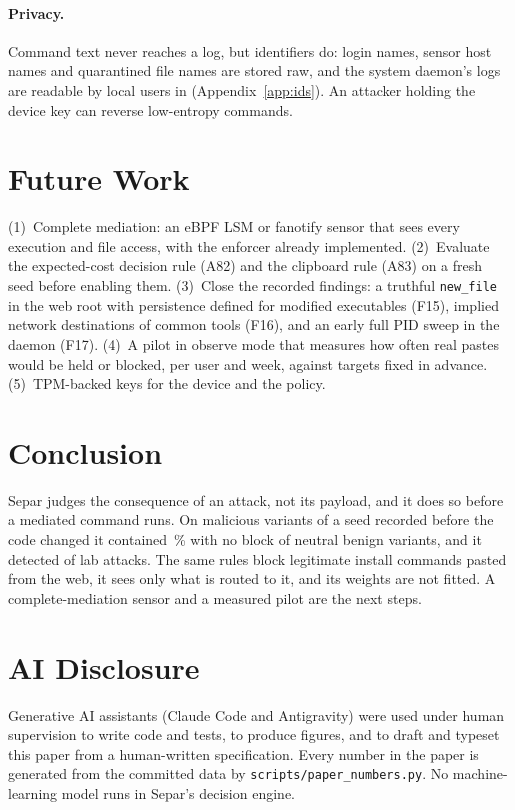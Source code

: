 \documentclass[10pt,twocolumn,letterpaper]{article}
\begin{document}
\paragraph{Privacy.} Command text never reaches a log, but identifiers do: login names, sensor host
names and quarantined file names are stored raw, and the system daemon's logs are readable by local
users in \Version{} (Appendix~\ref{app:ids}). An attacker holding the device key can reverse
low-entropy commands.

\section{Future Work}
\label{sec:future}
(1)~Complete mediation: an eBPF LSM or fanotify sensor that sees every execution and file access,
with the enforcer already implemented. (2)~Evaluate the expected-cost decision rule (A82) and the
clipboard rule (A83) on a fresh seed before enabling them. (3)~Close the recorded findings: a
truthful \texttt{new\_file} in the web root with persistence defined for modified executables
(F15), implied network destinations of common tools (F16), and an early full PID sweep in the
daemon (F17). (4)~A pilot in observe mode that measures how often real pastes would be held or
blocked, per user and week, against targets fixed in advance. (5)~TPM-backed keys for the device
and the policy.

\section{Conclusion}
Separ judges the consequence of an attack, not its payload, and it does so before a mediated
command runs. On \MalTotal{} malicious variants of a seed recorded before the code changed it
contained \MalContainedPct\,\% with no block of \BenNeutralTotal{} neutral benign variants, and it
detected \LabDetected{} of \LabAttacksAll{} lab attacks. The same rules block legitimate install
commands pasted from the web, it sees only what is routed to it, and its weights are not fitted.
A complete-mediation sensor and a measured pilot are the next steps.

\section*{AI Disclosure}
Generative AI assistants (Claude Code and Antigravity) were used under human supervision to write
code and tests, to produce figures, and to draft and typeset this paper from a human-written
specification. Every number in the paper is generated from the committed data by
\texttt{scripts/paper\_numbers.py}. No machine-learning model runs in Separ's decision engine.
\end{document}
